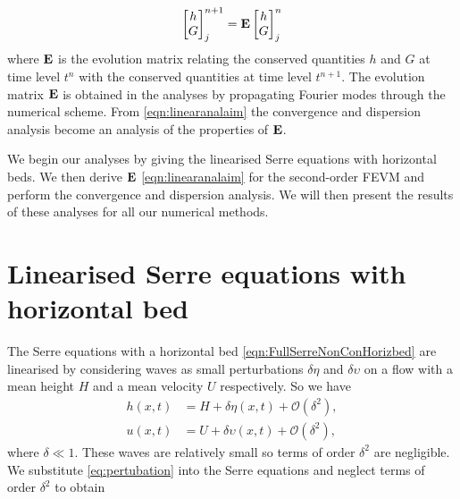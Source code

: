 \begin{equation}
\label{eqn:linearanalaim}
\begin{bmatrix}
h \\G
\end{bmatrix}^{n+1}_j = \mathbf{E} \begin{bmatrix}
h \\G
\end{bmatrix}^{n}_j
\end{equation}
 where $\mathbf{E}$ is the evolution matrix relating the conserved quantities $h$ and $G$ at time level $t^n$ with the conserved quantities at time level $t^{n+1}$. The evolution matrix $\mathbf{E}$ is obtained in the analyses by propagating Fourier modes through the numerical scheme. From \eqref{eqn:linearanalaim} the convergence and dispersion analysis become an analysis of the properties of $\mathbf{E}$.
 
 We begin our analyses by giving the linearised Serre equations with horizontal beds. We then derive $\mathbf{E}$ \eqref{eqn:linearanalaim} for the second-order FEVM and perform the convergence and dispersion analysis. We will then present the results of these analyses for all our numerical methods.
 
\section{Linearised Serre equations with horizontal bed}
The Serre equations with a horizontal bed \eqref{eqn:FullSerreNonConHorizbed} are linearised by considering waves as small perturbations $\delta\eta$ and $\delta\upsilon$ on a flow with a mean height $H$ and a mean velocity $U$ respectively. So we have
\begin{subequations}
	\label{eq:pertubation}
\begin{align}
h(x,t) &= H + \delta \eta(x,t) + \mathcal{O}\left(\delta^2 \right), \\
u(x,t) &= U + \delta \upsilon(x,t) + \mathcal{O}\left(\delta^2 \right),
\end{align}
\end{subequations}
where $\delta \ll 1$. These waves are relatively small so terms of order $\delta^2$ are negligible. We substitute \eqref{eq:pertubation} into the Serre equations and neglect terms of order $\delta^2$ to obtain


